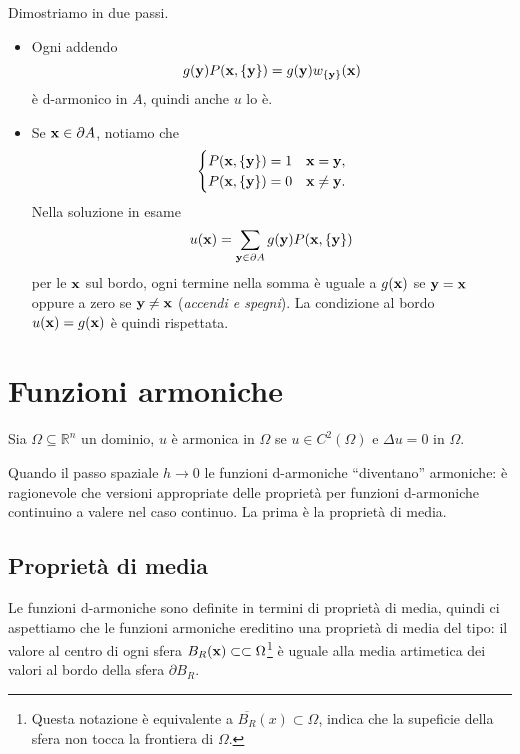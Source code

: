 \begin{dimostrazione} Dimostriamo in due passi.
    \begin{itemize}
        \item Ogni addendo
              \begin{equation*}
                  g(\mathbf{y}) P(\mathbf{x},\{\mathbf{y}\}) =g(\mathbf{y}) w_{\{\mathbf{y}\}}(\mathbf{x})
              \end{equation*}
              è d-armonico in $A$, quindi anche $u$ lo è.

        \item Se $\mathbf{x}\in \partial A$, notiamo che
              \begin{equation*}
                  \begin{cases}
                      P(\mathbf{x},\{\mathbf{y}\}) =1 & \mathbf{x}=\mathbf{y},     \\
                      P(\mathbf{x},\{\mathbf{y}\}) =0 & \mathbf{x}\neq \mathbf{y}.
                  \end{cases}
              \end{equation*}
              Nella soluzione in esame
              \begin{equation*}
                  u(\mathbf{x}) =\sum _{\mathbf{y}\in \partial A} g(\mathbf{y}) P(\mathbf{x},\{\mathbf{y}\})
              \end{equation*}
              per le $\mathbf{x}$ sul bordo, ogni termine nella somma è uguale a $g(\mathbf{x})$ se $\mathbf{y}=\mathbf{x}$ oppure a zero se $\mathbf{y}\neq \mathbf{x}$ (\textit{accendi e spegni}).
              La condizione al bordo $u(\mathbf{x}) =g(\mathbf{x})$ è quindi rispettata.
    \end{itemize}
\end{dimostrazione}
\section{Funzioni armoniche}

Sia $\Omega \subseteq \mathbb{R}^{n}$ un dominio, $u$ è armonica in $\Omega $ se $u\in C^{2}(\Omega)$ e $\Delta u=0$ in $\Omega $.

Quando il passo spaziale $h\rightarrow 0$ le funzioni d-armoniche ``diventano'' armoniche: è ragionevole che versioni appropriate delle proprietà per funzioni d-armoniche continuino a valere nel caso continuo. La prima è la proprietà di media.
\subsection{Proprietà di media}

Le funzioni d-armoniche sono definite in termini di proprietà di media, quindi ci aspettiamo che le funzioni armoniche ereditino una proprietà di media del tipo: il valore al centro di ogni sfera $B_{R}(\mathbf{x}) \subset \subset \Omega $\footnote{Questa notazione è equivalente a $\overline{B_{R}}(x) \subset \Omega $, indica che la supeficie della sfera non tocca la frontiera di $\Omega $.} è uguale alla media artimetica dei valori al bordo della sfera $\partial B_{R}$.

